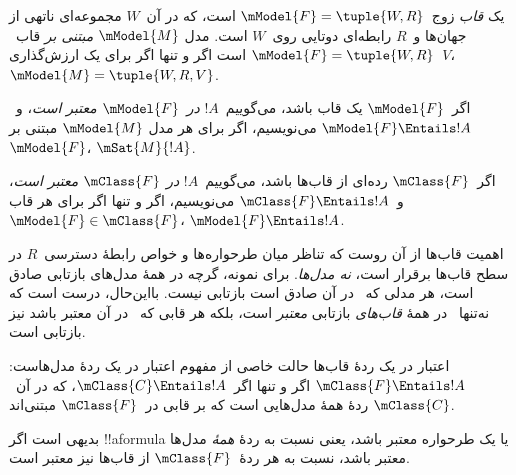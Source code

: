 \documentclass[../../../include/open-logic-section]{subfiles}
\begin{document}


\begin{defn}
  یک \emph{قاب} زوج~$\mModel{F} = \tuple{W,R}$ است، که در آن~$W$
  مجموعه‌ای ناتهی از جهان‌ها و~$R$ رابطه‌ای دوتایی روی~$W$ است. مدل
  $\mModel{M}$ \emph{مبتنی بر} قاب~$\mModel{F} = \tuple{W,R}$ است اگر
  و تنها اگر برای یک ارزش‌گذاری~$V$،
  $\mModel{M} = \tuple{W, R, V}$.
\end{defn}

\begin{defn}
  اگر~$\mModel{F}$ یک قاب باشد، می‌گوییم~$!A$ \emph{در~$\mModel{F}$
  معتبر است}، و~$\mModel{F} \Entails !A$ می‌نویسیم، اگر برای هر مدل
  $\mModel{M}$ مبتنی بر~$\mModel{F}$، $\mSat{M}{!A}$.
  
  اگر~$\mClass{F}$ رده‌ای از قاب‌ها باشد، می‌گوییم~$!A$ \emph{در
  $\mClass{F}$ معتبر است}، و~$\mClass{F} \Entails !A$ می‌نویسیم، اگر
  و تنها اگر برای هر قاب~$\mModel{F} \in \mClass{F}$،
  $\mModel{F} \Entails !A$.
\end{defn}

اهمیت قاب‌ها از آن روست که تناظر میان طرحواره‌ها و خواص رابطهٔ
دسترسی~$R$ در سطح قاب‌ها برقرار است، \emph{نه مدل‌ها}. برای نمونه، گرچه
 در همهٔ مدل‌های بازتابی صادق است، هر مدلی که~ در آن صادق
است بازتابی نیست. بااین‌حال، درست است که نه‌تنها~ در همهٔ
\emph{قاب‌های} بازتابی \emph{معتبر} است، بلکه هر قابی که~ در آن
معتبر باشد نیز بازتابی است.

\begin{rem}
اعتبار در یک ردهٔ قاب‌ها حالت خاصی از مفهوم اعتبار در یک ردهٔ مدل‌هاست:
$\mClass{F} \Entails !A$ اگر و تنها اگر~$\mClass{C} \Entails !A$، که
در آن~$\mClass{C}$ ردهٔ همهٔ مدل‌هایی است که بر قابی در~$\mClass{F}$
مبتنی‌اند.

بدیهی است اگر !!a{formula} یا یک طرحواره معتبر باشد، یعنی نسبت به ردهٔ
\emph{همهٔ} مدل‌ها معتبر باشد، نسبت به هر ردهٔ~$\mClass{F}$ از قاب‌ها
نیز معتبر است.
\end{rem}
\end{document}
